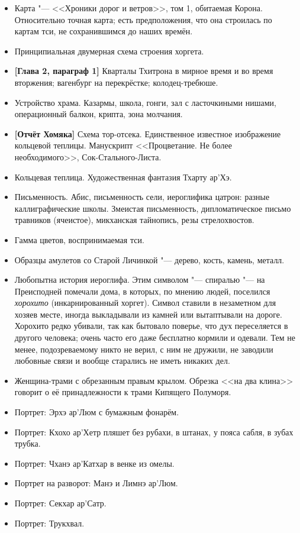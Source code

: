 \documentclass[a4paper,10pt]{book}
\begin{document}
\begin{itemize}
 \item Карта "--- <<Хроники дорог и ветров>>, том 1, обитаемая Корона. 
Относительно точная карта; есть предположения, что
 она строилась по картам тси, не сохранившимся до наших времён.
 \item Принципиальная двумерная схема строения хоргета.
 \item \textbf{[Глава 2, параграф 1]} Кварталы Тхитрона в мирное время и во 
время вторжения; вагенбург на перекрёстке; колодец-требюше.
\item Устройство храма. Казармы, школа, гонги, зал с ласточкиными нишами, 
операционный балкон, крипта, зона молчания.
\item \textbf{[Отчёт Хомяка]} Схема тор-отсека. Единственное известное 
изображение
кольцевой теплицы. Манускрипт <<Процветание. Не более необходимого>>,
Сок-Стального-Листа.
\item Кольцевая теплица. Художественная фантазия Тхарту ар'Хэ.
\item Письменность. Абис, письменность сели, иероглифика цатрон: разные 
каллиграфические школы.
Змеистая письменность, дипломатическое письмо травников (ячеистое), микханская 
тайнопись,
резы стрелохвостов.
\item Гамма цветов, воспринимаемая тси.
\item Образцы амулетов со Старой Личинкой "--- дерево, кость, камень, металл.
\item Любопытна история иероглифа. Этим символом "--- спиралью "--- на Преисподней помечали дома, в которых, по мнению людей, поселился \textit{хорохито} (инкарнированный хоргет). Символ ставили в незаметном для хозяев месте, иногда выкладывали из камней или вытаптывали на дороге. Хорохито редко убивали, так как бытовало поверье, что дух переселяется в другого человека; очень часто его даже бесплатно кормили и одевали. Тем не менее, подозреваемому никто не верил, с ним не дружили, не заводили любовные связи и вообще старались не иметь никаких дел.
\item Женщина-трами с обрезанным правым крылом. Обрезка <<на два клина>> говорит о её принадлежности к трами Кипящего Полуморя.
\item Портрет: Эрхэ ар'Люм с бумажным фонарём.
\item Портрет: Кхохо ар'Хетр пляшет без рубахи, в штанах, у пояса сабля, в зубах трубка.
\item Портрет: Чханэ ар'Катхар в венке из омелы.
\item Портрет на разворот: Манэ и Лимнэ ар'Люм.
\item Портрет: Секхар ар'Сатр.
\item Портрет: Трукхвал.
\end{itemize}
\end{document}
